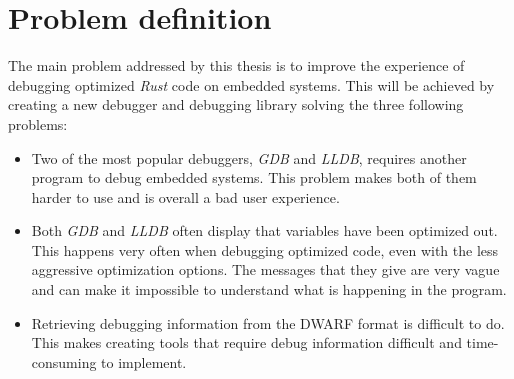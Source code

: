 \section{Problem definition} \label{sec:problemDef}
 

The main problem addressed by this thesis is to improve the experience of debugging optimized \emph{Rust} code on embedded systems.
This will be achieved by creating a new debugger and debugging library solving the three following problems:

\begin{itemize}
\item Two of the most popular debuggers, \emph{GDB} and \emph{LLDB}, requires another program to debug embedded systems.
This problem makes both of them harder to use and is overall a bad user experience.

\item Both \emph{GDB} and \emph{LLDB} often display that variables have been optimized out.
This happens very often when debugging optimized code, even with the less aggressive optimization options.
The messages that they give are very vague and can make it impossible to understand what is happening in the program.

\item Retrieving debugging information from the \gls{DWARF} format is difficult to do. 
This makes creating tools that require debug information difficult and time-consuming to implement.

\end{itemize}

